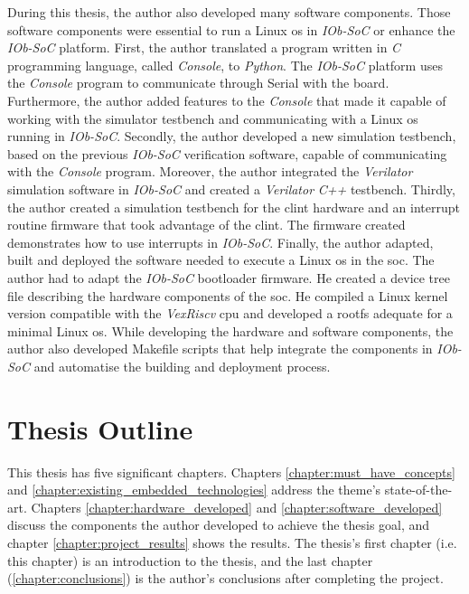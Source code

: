 During this thesis, the author also developed many software components. Those software components were essential to run a Linux \acrshort{os} in \textit{IOb-SoC} or enhance the \textit{IOb-SoC} platform. First, the author translated a program written in \textit{C} programming language, called \textit{Console}, to \textit{Python}. The \textit{IOb-SoC} platform uses the \textit{Console} program to communicate through Serial with the board. Furthermore, the author added features to the \textit{Console} that made it capable of working with the simulator testbench and communicating with a Linux \acrshort{os} running in \textit{IOb-SoC}. Secondly, the author developed a new simulation testbench, based on the previous \textit{IOb-SoC} verification software, capable of communicating with the \textit{Console} program. Moreover, the author integrated the \textit{Verilator}~\cite{snyder2010verilator} simulation software in \textit{IOb-SoC} and created a \textit{Verilator} \textit{C++} testbench. Thirdly, the author created a simulation testbench for the \acrshort{clint} hardware and an interrupt routine firmware that took advantage of the \acrshort{clint}. The firmware created demonstrates how to use interrupts in \textit{IOb-SoC}. Finally, the author adapted, built and deployed the software needed to execute a Linux \acrshort{os} in the \acrshort{soc}. The author had to adapt the \textit{IOb-SoC} bootloader firmware. He created a device tree file describing the hardware components of the \acrshort{soc}. He compiled a Linux kernel version compatible with the \textit{VexRiscv} \acrshort{cpu} and developed a \acrshort{rootfs} adequate for a minimal Linux \acrshort{os}. While developing the hardware and software components, the author also developed Makefile scripts that help integrate the components in \textit{IOb-SoC} and automatise the building and deployment process.


\section{Thesis Outline}
\label{section:thesis_outline}
This thesis has five significant chapters. Chapters \ref{chapter:must_have_concepts} and \ref{chapter:existing_embedded_technologies} address the theme's state-of-the-art. Chapters \ref{chapter:hardware_developed} and \ref{chapter:software_developed} discuss the components the author developed to achieve the thesis goal, and chapter \ref{chapter:project_results} shows the results. The thesis's first chapter (i.e. this chapter) is an introduction to the thesis, and the last chapter (\ref{chapter:conclusions}) is the author's conclusions after completing the project.

